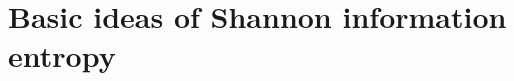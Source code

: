 \documentclass[smallextended]{svjour3}
\newcommand{\E}{\mathbb{E}}
\renewcommand{\H}{\mathbb{H}}
\newcommand{\suml}{\sum\limits}
\newcommand{\dd}[1]{\,\mathrm{d}#1}
\newcommand{\bits}{\mathrm{bits}}
\newcommand{\nats}{\mathrm{nats}}
\newcommand{\ie}{i.e.}
\newcommand{\pdf}{probability density function}
\begin{document}




\appendix

\section{Basic ideas of Shannon information entropy}
\label{sec:entropy_basics_extended}

% 
\end{document}
